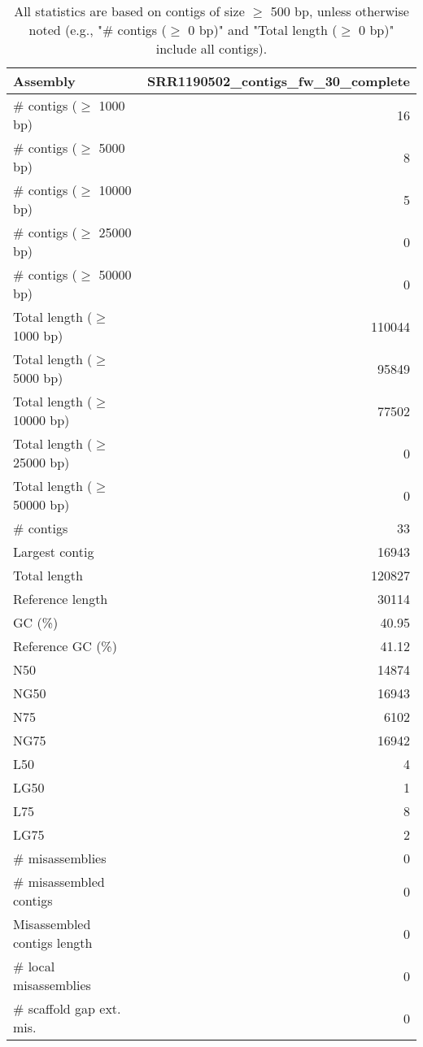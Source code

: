\documentclass[12pt,a4paper]{article}
\begin{document}
\begin{table}[ht]
\begin{center}
\caption{All statistics are based on contigs of size $\geq$ 500 bp, unless otherwise noted (e.g., "\# contigs ($\geq$ 0 bp)" and "Total length ($\geq$ 0 bp)" include all contigs).}
\begin{tabular}{|l*{1}{|r}|}
\hline
Assembly & SRR1190502\_contigs\_fw\_30\_complete \\ \hline
\# contigs ($\geq$ 1000 bp) & 16 \\ \hline
\# contigs ($\geq$ 5000 bp) & 8 \\ \hline
\# contigs ($\geq$ 10000 bp) & 5 \\ \hline
\# contigs ($\geq$ 25000 bp) & 0 \\ \hline
\# contigs ($\geq$ 50000 bp) & 0 \\ \hline
Total length ($\geq$ 1000 bp) & 110044 \\ \hline
Total length ($\geq$ 5000 bp) & 95849 \\ \hline
Total length ($\geq$ 10000 bp) & 77502 \\ \hline
Total length ($\geq$ 25000 bp) & 0 \\ \hline
Total length ($\geq$ 50000 bp) & 0 \\ \hline
\# contigs & 33 \\ \hline
Largest contig & 16943 \\ \hline
Total length & 120827 \\ \hline
Reference length & 30114 \\ \hline
GC (\%) & 40.95 \\ \hline
Reference GC (\%) & 41.12 \\ \hline
N50 & 14874 \\ \hline
NG50 & 16943 \\ \hline
N75 & 6102 \\ \hline
NG75 & 16942 \\ \hline
L50 & 4 \\ \hline
LG50 & 1 \\ \hline
L75 & 8 \\ \hline
LG75 & 2 \\ \hline
\# misassemblies & 0 \\ \hline
\# misassembled contigs & 0 \\ \hline
Misassembled contigs length & 0 \\ \hline
\# local misassemblies & 0 \\ \hline
\# scaffold gap ext. mis. & 0 \\ \hline

\end{tabular}
\end{center}
\end{table}
\end{document}
